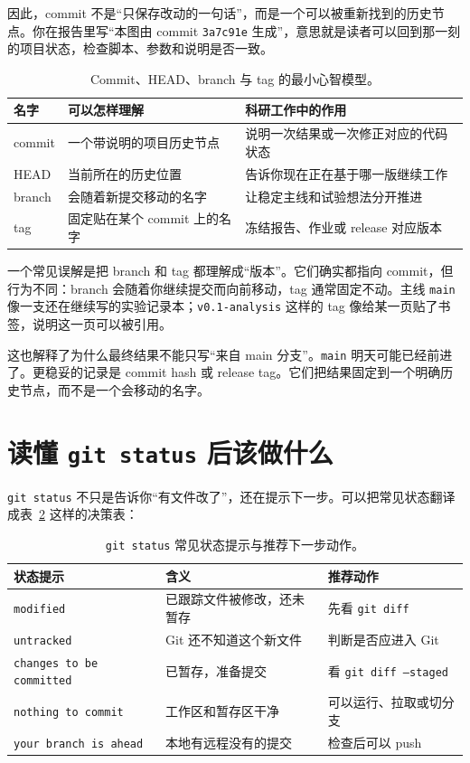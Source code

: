 因此，commit 不是“只保存改动的一句话”，而是一个可以被重新找到的历史节点。你在报告里写“本图由 commit \texttt{3a7c91e} 生成”，意思就是读者可以回到那一刻的项目状态，检查脚本、参数和说明是否一致。

\begin{table}[htbp]
\centering
\begin{tabular}{p{}p{}p{}}
\toprule
名字 & 可以怎样理解 & 科研工作中的作用 \\
\midrule
commit & 一个带说明的项目历史节点 & 说明一次结果或一次修正对应的代码状态 \\
HEAD & 当前所在的历史位置 & 告诉你现在正在基于哪一版继续工作 \\
branch & 会随着新提交移动的名字 & 让稳定主线和试验想法分开推进 \\
tag & 固定贴在某个 commit 上的名字 & 冻结报告、作业或 release 对应版本 \\
\bottomrule
\end{tabular}
\caption{Commit、HEAD、branch 与 tag 的最小心智模型。}
\label{tab:ch02_commit_names}
\end{table}

一个常见误解是把 branch 和 tag 都理解成“版本”。它们确实都指向 commit，但行为不同：branch 会随着你继续提交而向前移动，tag 通常固定不动。主线 \texttt{main} 像一支还在继续写的实验记录本；\texttt{v0.1-analysis} 这样的 tag 像给某一页贴了书签，说明这一页可以被引用。

这也解释了为什么最终结果不能只写“来自 main 分支”。\texttt{main} 明天可能已经前进了。更稳妥的记录是 commit hash 或 release tag。它们把结果固定到一个明确历史节点，而不是一个会移动的名字。

\section{读懂 \texttt{git status} 后该做什么}

\texttt{git status} 不只是告诉你“有文件改了”，还在提示下一步。可以把常见状态翻译成表~\ref{tab:ch02_status_decisions} 这样的决策表：

\begin{table}[htbp]
\centering
\begin{tabular}{p{}p{}p{}}
\toprule
状态提示 & 含义 & 推荐动作 \\
\midrule
\texttt{modified} & 已跟踪文件被修改，还未暂存 & 先看 \texttt{git diff} \\
\texttt{untracked} & Git 还不知道这个新文件 & 判断是否应进入 Git \\
\texttt{changes to be committed} & 已暂存，准备提交 & 看 \texttt{git diff --staged} \\
\texttt{nothing to commit} & 工作区和暂存区干净 & 可以运行、拉取或切分支 \\
\texttt{your branch is ahead} & 本地有远程没有的提交 & 检查后可以 push \\
\bottomrule
\end{tabular}
\caption{\texttt{git status} 常见状态提示与推荐下一步动作。}
\label{tab:ch02_status_decisions}
\end{table}

